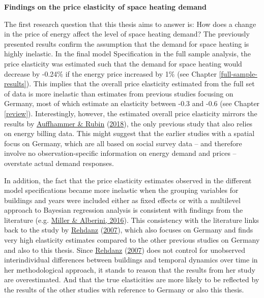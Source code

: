 \documentclass[12pt,twoside]{reedthesis}
\begin{document}
\textbf{Findings on the price elasticity of space heating demand}

The first research question that this thesis aims to answer is: How does a change in the price of energy affect the level of space heating demand? The previously presented results confirm the assumption that the demand for space heating is highly inelastic. In the final model Specification in the full sample analysis, the price elasticity was estimated such that the demand for space heating would decrease by -0.24\% if the energy price increased by 1\% (see Chapter \ref{full-sample-results}). This implies that the overall price elasticity estimated from the full set of data is more inelastic than estimates from previous studies focusing on Germany, most of which estimate an elasticity between -0.3 and -0.6 (see Chapter \ref{review}). Interestingly, however, the estimated overall price elasticity mirrors the results by \protect\hyperlink{ref-auffhammer_rubin18}{Auffhammer \& Rubin} (\protect\hyperlink{ref-auffhammer_rubin18}{2018}), the only previous study that also relies on energy billing data. This might suggest that the earlier studies with a spatial focus on Germany, which are all based on social survey data -- and therefore involve no observation-specific information on energy demand and prices -- overstate actual demand responses.

In addition, the fact that the price elasticity estimates observed in the different model specifications became more inelastic when the grouping variables for buildings and years were included either as fixed effects or with a multilevel approach to Bayesian regression analysis is consistent with findings from the literature (e.g. \protect\hyperlink{ref-miller_alberini16}{Miller \& Alberini, 2016}). This consistency with the literature links back to the study by \protect\hyperlink{ref-rehdanz07}{Rehdanz} (\protect\hyperlink{ref-rehdanz07}{2007}), which also focuses on Germany and finds very high elasticity estimates compared to the other previous studies on Germany and also to this thesis. Since \protect\hyperlink{ref-rehdanz07}{Rehdanz} (\protect\hyperlink{ref-rehdanz07}{2007}) does not control for unobserved interindividual differences between buildings and temporal dynamics over time in her methodological approach, it stands to reason that the results from her study are overestimated. And that the true elasticities are more likely to be reflected by the results of the other studies with reference to Germany or also this thesis.
\end{document}

